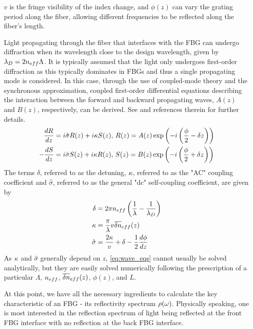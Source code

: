 $v$ is the fringe visibility of the index change, and $\phi(z)$ can vary the grating period along the fiber, allowing different frequencies to be reflected along the fiber's length.
%
\par
%
Light propagating through the fiber that interfaces with the FBG can undergo diffraction when its wavelength close to the design wavelength, given by $\lambda_D = 2 n_{eff} \Lambda$. 
It is typically assumed that the light only undergoes first-order diffraction as this typically dominates in FBGs and thus a single propagating mode is considered. 
In this case, through the use of coupled-mode theory and the synchronous approximation, 
coupled first-order differential equations describing the interaction between the forward and backward propagating waves, $A(z)$ and $B(z)$, respectively, can be derived. 
See \cite{erdogan1997fiber} and references therein for further details.
%
\begin{equation}
\label{eq:wave_eqs}
    \begin{aligned}
        \frac{dR}{dz} &= i \hat{\sigma} R(z) + i \kappa S(z), \, R(z) = A(z) \exp{ \left( -i \left( \frac{\phi}{2} -\delta z \right) \right) }\\
        -\frac{dS}{dz} &= i \hat{\sigma} S(z) + i \kappa R(z), \, S(z) = B(z) \exp{ \left( -i \left( \frac{\phi}{2} + \delta z \right) \right) }
    \end{aligned}
\end{equation}
%
The terms $\delta$, referred to as the detuning, $\kappa$, referred to as the "AC" coupling coefficient and $\hat{\sigma}$, referred to as the general "dc" self-coupling coefficient, are given by
%
\begin{align}
    \label{eq:delta}
    \delta &= 2 \pi n_{eff} \left( \frac{1}{\lambda} - \frac{1}{\lambda_D} \right) \\
    \label{eq:kappa}
    \kappa &= \frac{\pi}{\lambda} v \overline{\delta n}_{eff}(z)\\
    \label{eq:sigma}
    \hat{\sigma} &= \frac{2\kappa}{v} + \delta -\frac{1}{2}\frac{d\phi}{dz}
\end{align}
%
As $\kappa$ and $\hat{\sigma}$ generally depend on $z$, \eqref{eq:wave_eqs} cannot usually be solved analytically, but they are easily solved numerically following the prescription of a particular $\Lambda$, $n_{eff}$, $\overline{\delta n}_{eff}(z)$, $\phi(z)$, and $L$. 
%
\par
%
At this point, we have all the necessary ingredients to calculate the key characteristic of an FBG - its reflectivity spectrum $\rho(\omega)$. 
Physically speaking, one is most interested in the reflection spectrum of light being reflected at the front FBG interface with no reflection at the back FBG interface. 

